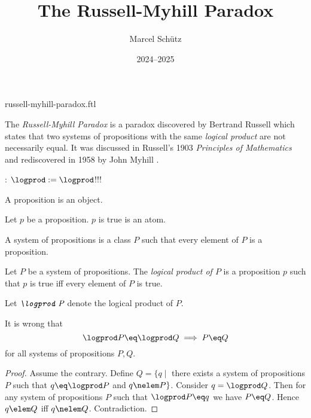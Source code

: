 \documentclass{article}
\title{The Russell-Myhill Paradox}
\author{Marcel Schütz}
\date{2024--2025}
\begin{document}
\begin{smodule}{russell-myhill-paradox.ftl}
\maketitle



\noindent The \emph{Russell-Myhill Paradox} is a paradox discovered by 
Bertrand Russell which states that two systems of propositions with the same 
\emph{logical product} are not necessarily equal.
It was discussed in Russell's 1903 \emph{Principles of Mathematics}
\cite[Appendix B]{Russell1903} and rediscovered in 1958 by John Myhill
\cite{Myhill1958}.

\begin{sdefinition}[for=logprod]
  :
  $\logprod := \logprod$!!!
\end{sdefinition}

\begin{forthel}
  \begin{signature*}
    A proposition is an object.
  \end{signature*}

  \begin{signature*}
    Let $p$ be a proposition.
    $p$ is true is an atom.
  \end{signature*}

  \begin{definition*}
    A system of propositions is a class $P$ such that every element of $P$ is a proposition.
  \end{definition*}

  \begin{signature*}
    Let $P$ be a system of propositions.
    The \emph{logical product of $P$} is a proposition $p$ such that $p$ is true iff every element of $P$ is true.
  \end{signature*}
  
  Let $\emph{\logprod P}$ denote the logical product of $P$.
  
  \begin{theorem*}[title=Russell-Myhill Paradox,id=russell_myhill_paradox]
    It is wrong that
    \[ \logprod P \eq \logprod Q \implies P \eq Q \]
    for all systems of propositions $P, Q$.
  \end{theorem*}
  \begin{proof}
    Assume the contrary.
    Define $Q = \{q \mid$ there exists a system of propositions $P$ such that $q \eq \logprod P$ and $q \nelem P\}$.
    Consider $q = \logprod Q$.
    Then for any system of propositions $P$ such that $\logprod P \eq q$ we have $P \eq Q$.
    Hence $q \elem Q$ iff $q \nelem Q$.
    Contradiction.
  \end{proof}
\end{forthel}

\printbibliography
{}
\end{smodule}
\end{document}
